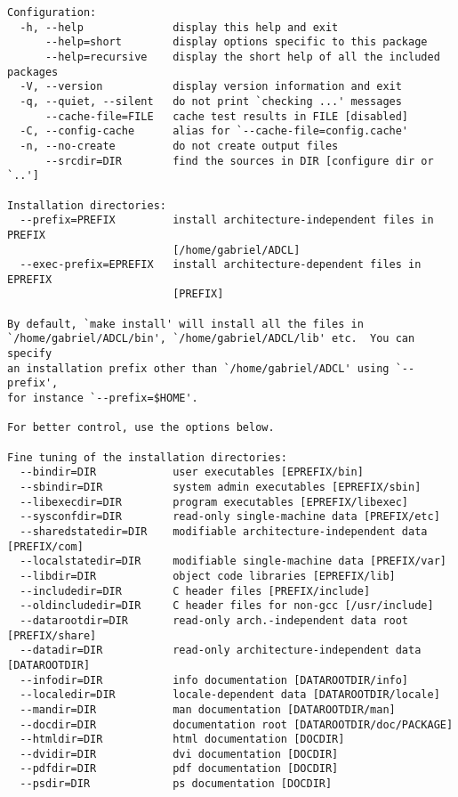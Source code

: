 \small
\begin{verbatim}
Configuration:
  -h, --help              display this help and exit
      --help=short        display options specific to this package
      --help=recursive    display the short help of all the included packages
  -V, --version           display version information and exit
  -q, --quiet, --silent   do not print `checking ...' messages
      --cache-file=FILE   cache test results in FILE [disabled]
  -C, --config-cache      alias for `--cache-file=config.cache'
  -n, --no-create         do not create output files
      --srcdir=DIR        find the sources in DIR [configure dir or `..']

Installation directories:
  --prefix=PREFIX         install architecture-independent files in PREFIX
                          [/home/gabriel/ADCL]
  --exec-prefix=EPREFIX   install architecture-dependent files in EPREFIX
                          [PREFIX]

By default, `make install' will install all the files in
`/home/gabriel/ADCL/bin', `/home/gabriel/ADCL/lib' etc.  You can specify
an installation prefix other than `/home/gabriel/ADCL' using `--prefix',
for instance `--prefix=$HOME'.

For better control, use the options below.

Fine tuning of the installation directories:
  --bindir=DIR            user executables [EPREFIX/bin]
  --sbindir=DIR           system admin executables [EPREFIX/sbin]
  --libexecdir=DIR        program executables [EPREFIX/libexec]
  --sysconfdir=DIR        read-only single-machine data [PREFIX/etc]
  --sharedstatedir=DIR    modifiable architecture-independent data [PREFIX/com]
  --localstatedir=DIR     modifiable single-machine data [PREFIX/var]
  --libdir=DIR            object code libraries [EPREFIX/lib]
  --includedir=DIR        C header files [PREFIX/include]
  --oldincludedir=DIR     C header files for non-gcc [/usr/include]
  --datarootdir=DIR       read-only arch.-independent data root [PREFIX/share]
  --datadir=DIR           read-only architecture-independent data [DATAROOTDIR]
  --infodir=DIR           info documentation [DATAROOTDIR/info]
  --localedir=DIR         locale-dependent data [DATAROOTDIR/locale]
  --mandir=DIR            man documentation [DATAROOTDIR/man]
  --docdir=DIR            documentation root [DATAROOTDIR/doc/PACKAGE]
  --htmldir=DIR           html documentation [DOCDIR]
  --dvidir=DIR            dvi documentation [DOCDIR]
  --pdfdir=DIR            pdf documentation [DOCDIR]
  --psdir=DIR             ps documentation [DOCDIR]


\end{verbatim}
